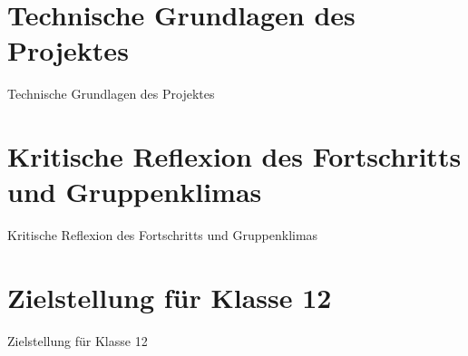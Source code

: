 \documentclass{beamer}
\begin{document}
\section{Technische Grundlagen des Projektes}

\begin{frame}{Technische Grundlagen des Projektes}

\end{frame}

\section{Kritische Reflexion des Fortschritts und Gruppenklimas}

\begin{frame}{Kritische Reflexion des Fortschritts und Gruppenklimas}

\end{frame}

\section{Zielstellung für Klasse 12}

\begin{frame}{Zielstellung für Klasse 12}

\end{frame}
\end{document}
